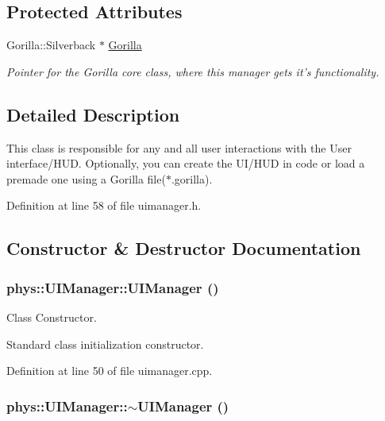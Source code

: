 \subsection*{Protected Attributes}
\begin{DoxyCompactItemize}
\item 
\hypertarget{classphys_1_1UIManager_af34fd7fdc0e7b02deeb21ec266a1550e}{
Gorilla::Silverback $\ast$ \hyperlink{classphys_1_1UIManager_af34fd7fdc0e7b02deeb21ec266a1550e}{Gorilla}}
\label{d5/dc5/classphys_1_1UIManager_af34fd7fdc0e7b02deeb21ec266a1550e}

\begin{DoxyCompactList}\small\item\em Pointer for the Gorilla core class, where this manager gets it's functionality. \item\end{DoxyCompactList}\end{DoxyCompactItemize}


\subsection{Detailed Description}
This class is responsible for any and all user interactions with the User interface/HUD. Optionally, you can create the UI/HUD in code or load a premade one using a Gorilla file($\ast$.gorilla). 

Definition at line 58 of file uimanager.h.



\subsection{Constructor \& Destructor Documentation}
\hypertarget{classphys_1_1UIManager_aeb502f11f170efd806b4153923c55359}{
\subsubsection[{UIManager}]{\setlength{\rightskip}{0pt plus 5cm}phys::UIManager::UIManager ()}}
\label{d5/dc5/classphys_1_1UIManager_aeb502f11f170efd806b4153923c55359}


Class Constructor. 

Standard class initialization constructor. 

Definition at line 50 of file uimanager.cpp.

\hypertarget{classphys_1_1UIManager_a203144f08dbaf8068746359c22aa4f1e}{
\subsubsection[{$\sim$UIManager}]{\setlength{\rightskip}{0pt plus 5cm}phys::UIManager::$\sim$UIManager ()}}
\label{d5/dc5/classphys_1_1UIManager_a203144f08dbaf8068746359c22aa4f1e}



